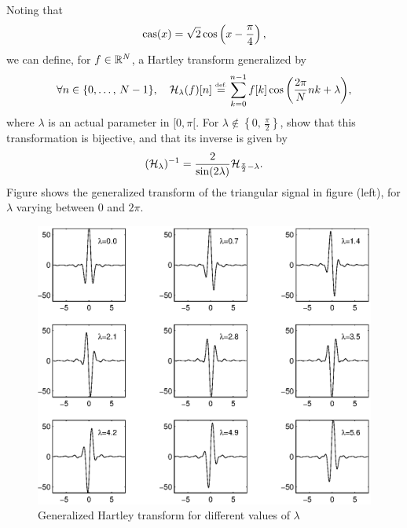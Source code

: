  
\begin{exo}
\label{exo-transfo-hartley-generalisee}
 
 Noting that
\begin{equation}
\label{eq-factorization-case}
\operatorname{cas} (x) = \sqrt{2} \cos \left(x - \frac{\pi}{4} \right),
\end{equation}
we can define, for $ f \in \mathbb{R}^N $, a Hartley transform generalized by
\begin{equation*}
\forall n \in \{0, \ldots, \, N-1 \}, \quad \mathcal{H}_{\lambda} (f) [n] \stackrel{\mbox{\upshape\tiny def.}}{=} \sum_{k = 0}^{n-1}{f [k] \cos \left(\frac{2 \pi}{N} nk + \lambda \right)},
\end{equation*}
where $ \lambda $ is an actual parameter in $ [0, \pi [$. For $ \lambda \notin \left\{0, \, \frac{\pi}{2} \right\} $, show that this transformation is bijective, and that its inverse is given by
\begin{equation}
\label{eq-inverse-hartley-generalized}
(\mathcal{H}_\lambda)^{-1} = \frac{2}{\sin (2 \lambda)} \mathcal{H}_{\frac{\pi}{2} - \lambda}.
\end{equation}
Figure  shows the generalized transform of the triangular signal in figure  (left), for $ \lambda $ varying between $ 0 $ and $ 2 \pi $. 

\begin{figure}[ht] 
    \begin{center}
    \includegraphics[scale=0.7]{images/transformee-hartley-generalisee.eps}
    \end{center}
    \caption{Generalized Hartley transform for different values of $ \lambda $}
              \label{fig-transforme-hartley-generalized}
\end{figure}
\end{exo}
 
